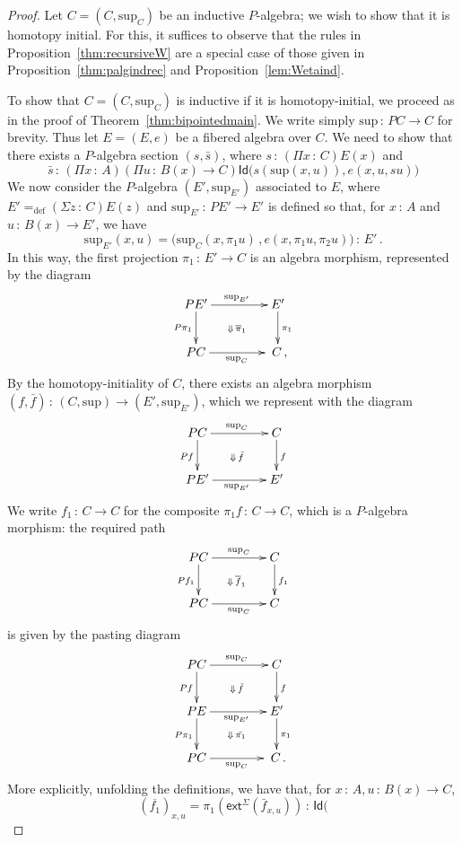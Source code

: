\documentclass[10pt,a4paper,oneside,reqno]{amsart}
\numberwithin{equation}{section}
\theoremstyle{mythm}
\theoremstyle{mydef}
\theoremstyle{myrmk}
\newcommand{\defeq}{=_{\mathrm{def}}}
\newcommand{\co}{\,{:}\,}
\newcommand{\ext}{\mathsf{ext}}
\newcommand{\Id}{\mathsf{Id}}
\renewcommand{\sup}{\mathrm{sup}}
\begin{document}
\begin{proof}
Let $C = (C, \sup_C)$ be an inductive $P$-algebra; we wish to show that it is homotopy initial.
For this, it suffices to observe that the rules in Proposition~\ref{thm:recursiveW} are a special case of those given in Proposition~\ref{thm:palgindrec} and Proposition~\ref{lem:Wetaind}.

To show that $C = (C, \sup_C)$ is inductive if it is homotopy-initial, we proceed as in the proof of
Theorem~\ref{thm:bipointedmain}. We write simply $\sup \co PC \to C$ for brevity.
Thus let $E = (E, e)$ be a fibered algebra over $C$. We need to show that there
exists a $P$-algebra section $(s, \bar{s})$, where $s \co (\Pi x \co C) E(x)$ and 
\[ 
\bar{s} \co (\Pi x \co A)(\Pi u \co B(x) \to C) \Id \big( s(\sup(x,u)), e(x, u, s u) \big)
\]
We now consider the $P$-algebra $(E', \sup_{E'})$ associated to $E$, where $E' \defeq
(\Sigma z \co C) E(z)$ and $\sup_{E'} \co PE' \to E'$ is defined so that, for $x \co A$ and $u \co B(x) \to E'$, 
we have
\[
\sup_{E'}(x,u) = \big( \sup_C(x,\pi_1  u) \, , e (x,\pi_1  u, \pi_2  u )\big) \co E' \, .
\]
In this way, the first projection $\pi_1 \co E' \to C$  is an algebra morphism, represented by the diagram
 \[
 \xymatrix@C=1.5cm{
 PE' \ar[d]_-{P \pi_1} \ar[r]^{\sup_{E'}} \ar@{}[dr]|{\Downarrow \,  \overline{\pi}_1} & E' \ar[d]^{\pi_1} \\
 PC \ar[r]_{\sup_C} & \; C \, ,}
 \]
By the homotopy-initiality of $C$, there exists an algebra morphism $(f, \bar{f}) \co (C, \sup)  \to (E', \sup_{E'})$,
which we represent with the diagram
\[
\xymatrix@C=1.5cm{
 PC \ar[r]^{\sup_C} \ar[d]_{Pf}  \ar@{}[dr]|{\Downarrow \, \bar{f}} &  C \ar[d]^{f}\\
PE' \ar[r]_{\sup_{E'}}   & E'}
\] 
We write $f_1 \co C \to C$ for the composite $\pi_1 f \co C \to C$, which is a $P$-algebra morphism: the 
required path 
\[
\xymatrix@C=1.5cm{
PC \ar[d]_{Pf_1} \ar[r]^-{\sup_{C}} \ar@{}[rd]|{\Downarrow \, \overline{f}_1} & C \ar[d]^{f_1} \\ 
PC  \ar[r]_-{\sup_C} & C }
 \]
is given by the pasting diagram
\[
\xymatrix@C=1.5cm{
 PC \ar[r]^{\sup_C} \ar[d]_{Pf}  \ar@{}[dr]|{\Downarrow \, \bar{f}} &  C \ar[d]^{f}\\
PE \ar[r]_{\sup_{E'}}  \ar[d]_{P\pi_1}   \ar@{}[dr]|{\Downarrow \, \bar{\pi_1}} & E' \ar[d]^{\pi_1}  \\
PC \ar[r]_{\sup_C} & \; C  \, .}
\] 
More explicitly, unfolding the definitions, we have that, for $x \co A,  u \co B(x) \to C$, 
\[
(\overline{f_1})_{x,u} =   \pi_1( \ext^\Sigma(\bar{f}_{x,u})) \co \Id(  
\]
\end{proof}
\end{document}

